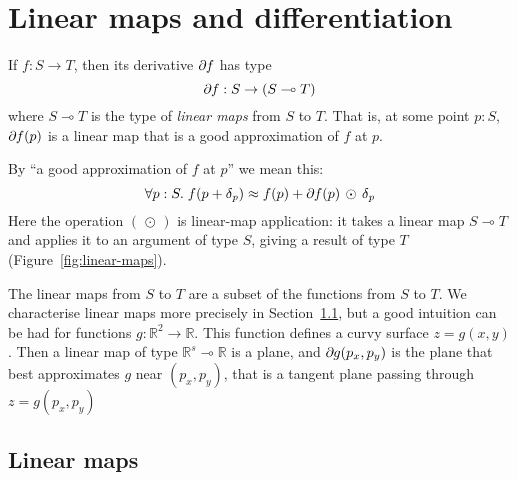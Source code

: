 \documentclass[sigplan,review]{acmart}
\newcommand{\deriv}{\partial}  %
\renewcommand{\to}{\rightarrow}    %
\newcommand{\linto}{\multimap}     %
\newcommand{\gradf}[1]{\deriv\hspace{-0.15mm} #1}  %
\renewcommand{\d}[1]{\delta_{\mathit{#1}}}   %
\newcommand{\real}{\mathbb{R}}       %
\newcommand{\lmcomp}{\,\circ\,}   %
\newcommand{\lmapply}{\,\odot\,}      %
\begin{document}
\section{Linear maps and differentiation}

If $f : S \to T$, then its derivative $\gradf{f}$ has type
$$\gradf{f} : S \to (S \linto T)$$
where $S \linto T$ is the type of \emph{linear maps} from $S$ to $T$.
That is, at some point $p:S$, $\gradf{f}(p)$ is a linear map
that is a good approximation of $f$ at $p$.

By ``a good approximation of $f$ at $p$'' we mean this:
$$
\forall p:S.\; f( p + \d{p} ) \approx f(p) + \gradf{f}(p) \lmapply \d{p}
$$
Here the operation $(\lmapply)$ is linear-map application: it takes a
linear map $S \linto T$ and applies it to an argument of type $S$,
giving a result of type $T$ (Figure~\ref{fig:linear-maps}).

The linear maps from $S$ to $T$ are a subset of the
functions from $S$ to $T$.  We characterise linear maps more precisely
in Section~\ref{sec:lin-maps}, but
a good intuition can be had for functions $g : \real^2 \to \real$.
This function defines a curvy surface $z = g(x,y)$.  Then a linear map
of type $\real^s \linto \real$ is a plane, and $\gradf{g}(p_x,p_y)$ is
the plane that best approximates $g$ near $(p_x,p_y)$, that is a tangent plane
passing through $z = g(p_x, p_y)$

\subsection{Linear maps} \label{sec:lin-maps}
\end{document}
